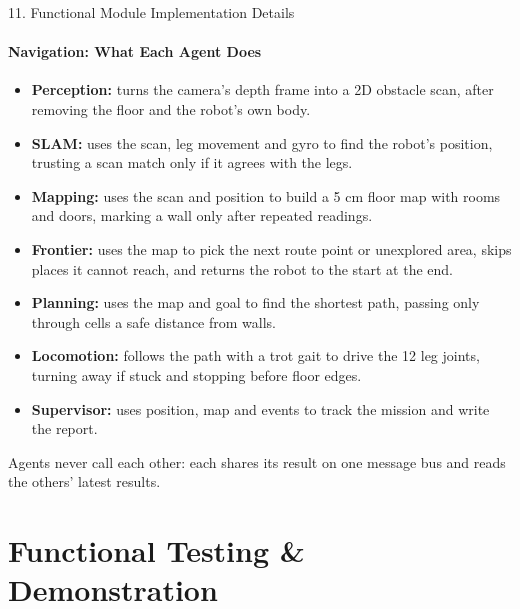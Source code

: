 \documentclass[aspectratio=169, 11pt]{beamer}
\begin{document}
\begin{frame}{11. Functional Module Implementation Details}
    \framesubtitle{Navigation: What Each Agent Does}
    \small
    \begin{itemize}
        \setlength{\itemsep}{2.8pt}
        \item \textbf{Perception:} turns the camera's depth frame into a 2D obstacle scan, after removing the floor and the robot's own body.
        \item \textbf{SLAM:} uses the scan, leg movement and gyro to find the robot's position, trusting a scan match only if it agrees with the legs.
        \item \textbf{Mapping:} uses the scan and position to build a 5 cm floor map with rooms and doors, marking a wall only after repeated readings.
        \item \textbf{Frontier:} uses the map to pick the next route point or unexplored area, skips places it cannot reach, and returns the robot to the start at the end.
        \item \textbf{Planning:} uses the map and goal to find the shortest path, passing only through cells a safe distance from walls.
        \item \textbf{Locomotion:} follows the path with a trot gait to drive the 12 leg joints, turning away if stuck and stopping before floor edges.
        \item \textbf{Supervisor:} uses position, map and events to track the mission and write the report.
    \end{itemize}

    \vspace{0.2cm}
    {\footnotesize Agents never call each other: each shares its result on one message bus and reads the others' latest results.}
\end{frame}

\section{Functional Testing \& Demonstration}
\end{document}
